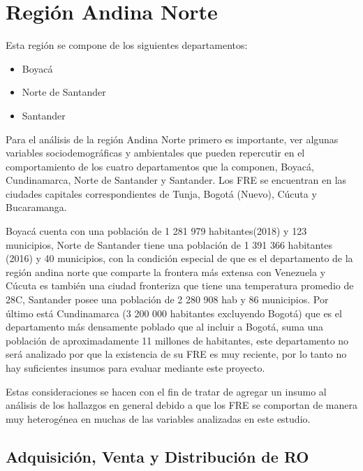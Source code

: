 \documentclass[
]{book}
\providecommand{\tightlist}{%
  \setlength{\itemsep}{0pt}\setlength{\parskip}{0pt}}
\begin{document}
\hypertarget{regiuxf3n-andina-norte}{%
\section{Región Andina Norte}\label{regiuxf3n-andina-norte}}

Esta región se compone de los siguientes departamentos:

\begin{itemize}
\tightlist
\item
  Boyacá
\item
  Norte de Santander
\item
  Santander
\end{itemize}

Para el análisis de la región Andina Norte primero es importante, ver algunas variables sociodemográficas y ambientales que pueden repercutir en el comportamiento de los cuatro departamentos que la componen, Boyacá, Cundinamarca, Norte de Santander y Santander. Los FRE se encuentran en las ciudades capitales correspondientes de Tunja, Bogotá (Nuevo), Cúcuta y Bucaramanga.

Boyacá cuenta con una población de 1 281 979 habitantes(2018) y 123 municipios, Norte de Santander tiene una población de 1 391 366 habitantes (2016) y 40 municipios, con la condición especial de que es el departamento de la región andina norte que comparte la frontera más extensa con Venezuela y Cúcuta es también una ciudad fronteriza que tiene una temperatura promedio de 28C, Santander posee una población de 2 280 908 hab y 86 municipios. Por último está Cundinamarca (3 200 000 habitantes excluyendo Bogotá) que es el departamento más densamente poblado que al incluir a Bogotá, suma una población de aproximadamente 11 millones de habitantes, este departamento no será analizado por que la existencia de su FRE es muy reciente, por lo tanto no hay suficientes insumos para evaluar mediante este proyecto.

Estas consideraciones se hacen con el fin de tratar de agregar un insumo al análisis de los hallazgos en general debido a que los FRE se comportan de manera muy heterogénea en muchas de las variables analizadas en este estudio.

\hypertarget{adquisiciuxf3n-venta-y-distribuciuxf3n-de-ro}{%
\subsection{Adquisición, Venta y Distribución de RO}\label{adquisiciuxf3n-venta-y-distribuciuxf3n-de-ro}}
\end{document}
